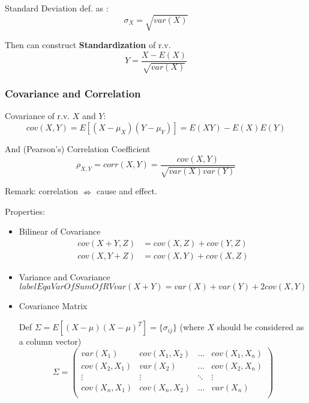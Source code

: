    Standard Deviation def. as :
    \begin{equation}\sigma_X=\sqrt{var(X)}\end{equation}

    Then can construct \textbf{Standardization} of r.v.
    \begin{equation}Y=\frac{X-E(X)}{\sqrt{var(X)}}\end{equation}


\subsubsection{Covariance and Correlation}\label{SubSubSectionCovarianceAndCorrelation}
    Covariance of r.v. $X$ and $Y$:\begin{equation}
        cov(X,Y)=E[(X-\mu_X)(Y-\mu_Y)]=E(XY)-E(X)E(Y)
    \end{equation}

    And (Pearson's) Correlation Coefficient\begin{equation}
        \rho_{X,Y}=corr(X,Y)=\frac{cov(X,Y)}{\sqrt{var(X)var(Y)}}
    \end{equation}

    Remark: correlation $\nRightarrow$ cause and effect.

    Properties:
\begin{itemize}
\item Bilinear of Covariance\begin{align*}
    cov(X+Y,Z)&=cov(X,Z)+cov(Y,Z)\\
    cov(X,Y+Z)&=cov(X,Y)+cov(X,Z)
\end{align*}
    
\item Variance and Covariance\begin{equation}label{EqaVarOfSumOfRV}
    var(X+Y)=var(X)+var(Y)+2cov(X,Y)
\end{equation}
\item Covariance Matrix

    Def $\Sigma=E[(X-\mu)(X-\mu)^T]=\{\sigma_{ij}\}$ (where $X$ should be considered as a column vector)
\begin{equation}\label{covariancematrix}
    \Sigma=
        \begin{pmatrix}
        var(X_1) & cov(X_1,X_2) & \ldots & cov(X_1,X_n)\\
        cov(X_2,X_1) & var(X_2) & \ldots & cov(X_2,X_n)\\
        \vdots & \vdots & \ddots & \vdots\\
        cov(X_n,X_1) & cov(X_n,X_2) & \ldots & var(X_n)\\
        \end{pmatrix}    
    \end{equation}
\end{itemize}

